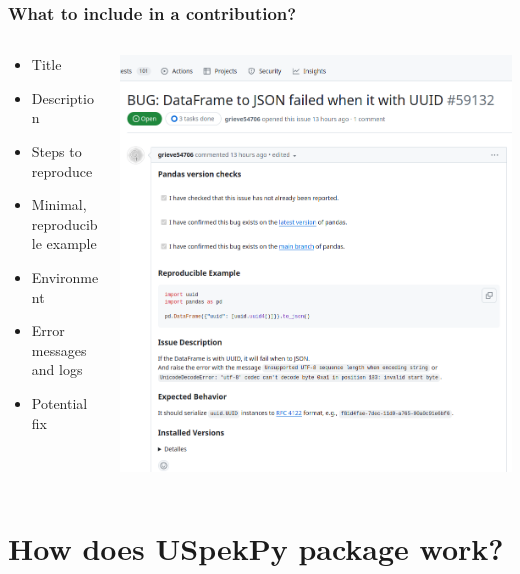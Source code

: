 \documentclass{beamer}
\begin{document}
	\begin{frame}
		\frametitle{What to include in a contribution?}
		\begin{columns}
			\begin{column}{0.35\textwidth}
				\begin{itemize}
					\item Title
					\item Description
					\item Steps to reproduce
					\item Minimal, reproducible example
					\item Environment
					\item Error messages and logs
					\item Potential fix
				\end{itemize}
			\end{column}
			\begin{column}{0.65\textwidth}
				\includegraphics[width=\textwidth]{pandas_issue}
			\end{column}
		\end{columns}
	\end{frame}
	
	\section{How does USpekPy package work?}
	
\end{document}
